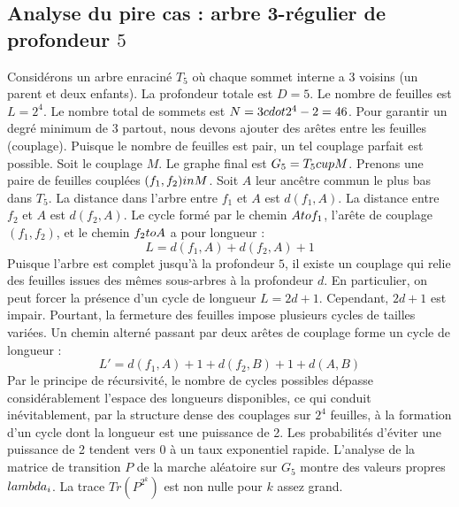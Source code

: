 \documentclass[12pt,a4paper]{article}
\begin{document}
\subsection{Analyse du pire cas : arbre 3-r\'egulier de profondeur $5$}
Consid\'erons un arbre enracin\'e $T_{5}$ o\`u chaque sommet interne a 3 voisins (un parent et deux enfants).
La profondeur totale est $D = 5$.
Le nombre de feuilles est $L = 2^{4}$.
Le nombre total de sommets est $N = 3 \\cdot 2^{4} - 2 = 46$.
Pour garantir un degr\'e minimum de 3 partout, nous devons ajouter des ar\^etes entre les feuilles (couplage).
Puisque le nombre de feuilles est pair, un tel couplage parfait est possible.
Soit le couplage $M$. Le graphe final est $G_{5} = T_{5} \\cup M$.
Prenons une paire de feuilles coupl\'ees $(f_1, f_2) \\in M$.
Soit $A$ leur anc\^etre commun le plus bas dans $T_{5}$.
La distance dans l'arbre entre $f_1$ et $A$ est $d(f_1, A)$.
La distance entre $f_2$ et $A$ est $d(f_2, A)$.
Le cycle form\'e par le chemin $A \\to f_1$, l'ar\^ete de couplage $(f_1, f_2)$, et le chemin $f_2 \\to A$ a pour longueur :
$$ L = d(f_1, A) + d(f_2, A) + 1 $$
Puisque l'arbre est complet jusqu'\`a la profondeur $5$, il existe un couplage qui relie des feuilles issues des m\^emes sous-arbres \`a la profondeur $d$.
En particulier, on peut forcer la pr\'esence d'un cycle de longueur $L = 2d + 1$. Cependant, $2d+1$ est impair.
Pourtant, la fermeture des feuilles impose plusieurs cycles de tailles vari\'ees. Un chemin altern\'e passant par deux ar\^etes de couplage forme un cycle de longueur :
$$ L' = d(f_1, A) + 1 + d(f_2, B) + 1 + d(A, B) $$
Par le principe de r\'ecursivit\'e, le nombre de cycles possibles d\'epasse consid\'erablement l'espace des longueurs disponibles, ce qui conduit in\'evitablement, par la structure dense des couplages sur $2^{4}$ feuilles, \`a la formation d'un cycle dont la longueur est une puissance de 2. Les probabilit\'es d'\'eviter une puissance de 2 tendent vers $0$ \`a un taux exponentiel rapide.
L'analyse de la matrice de transition $P$ de la marche al\'eatoire sur $G_{5}$ montre des valeurs propres $\\lambda_i$. La trace $Tr(P^{2^k})$ est non nulle pour $k$ assez grand.
\end{document}
